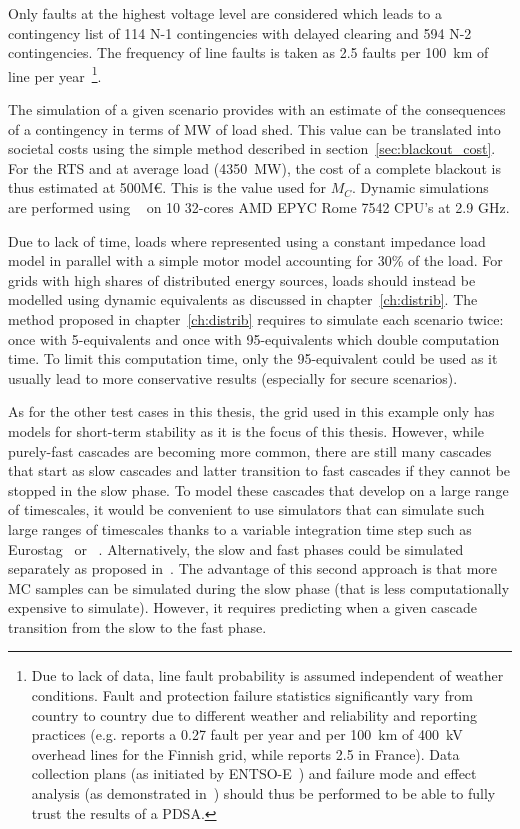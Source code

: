 Only faults at the highest voltage level are considered which leads to a contingency list of 114 N-1 contingencies with delayed clearing and 594 N-2 contingencies. The frequency of line faults is taken as 2.5 faults per 100~km of line per year~\cite{FaultStatisticsFrance}\footnote{Due to lack of data, line fault probability is assumed independent of weather conditions. Fault and protection failure statistics significantly vary from country to country due to different weather and reliability and reporting practices (e.g. \cite{GridPSA} reports a 0.27 fault per year and per 100~km of 400~kV overhead lines for the Finnish grid, while \cite{FaultStatisticsFrance} reports 2.5 in France). Data collection plans (as initiated by ENTSO-E~\cite{ENTSOE-PSA}) and failure mode and effect analysis (as demonstrated in~\cite{GridPSA}) should thus be performed to be able to fully trust the results of a PDSA.}.

The simulation of a given scenario provides with an estimate of the consequences of a contingency in terms of MW of load shed. This value can be translated into societal costs using the simple method described in section~\ref{sec:blackout_cost}. For the RTS and at average load (4350~MW), the cost of a complete blackout is thus estimated at 500M€. This is the value used for \(M_C\). Dynamic simulations are performed using \Dynawo{}~\cite{Dynawo} on 10 32-cores AMD EPYC Rome 7542 CPU's at 2.9 GHz.

Due to lack of time, loads where represented using a constant impedance load model in parallel with a simple motor model accounting for 30\% of the load. For grids with high shares of distributed energy sources, loads should instead be modelled using dynamic equivalents as discussed in chapter~\ref{ch:distrib}. The method proposed in chapter~\ref{ch:distrib} requires to simulate each scenario twice: once with 5-equivalents and once with 95-equivalents which double computation time. To limit this computation time, only the 95-equivalent could be used as it usually lead to more conservative results (especially for secure scenarios).

As for the other test cases in this thesis, the grid used in this example only has models for short-term stability as it is the focus of this thesis. However, while purely-fast cascades are becoming more common, there are still many cascades that start as slow cascades and latter transition to fast cascades if they cannot be stopped in the slow phase. To model these cascades that develop on a large range of timescales, it would be convenient to use simulators that can simulate such large ranges of timescales thanks to a variable integration time step such as Eurostag~\cite{STAG} or \Dynawo{}~\cite{Dynawo}. Alternatively, the slow and fast phases could be simulated separately as proposed in~\cite{TwoLevelPSA}. The advantage of this second approach is that more MC samples can be simulated during the slow phase (that is less computationally expensive to simulate). However, it requires predicting when a given cascade transition from the slow to the fast phase.



